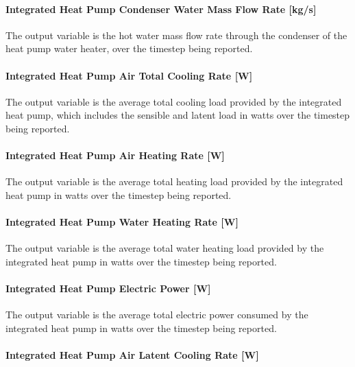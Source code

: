\paragraph{Integrated Heat Pump Condenser Water Mass Flow Rate {[}kg/s{]}}\label{Out-Cond-water-Flow-ASIHP}

The output variable is the hot water mass flow rate through the condenser of the heat pump water heater, over the timestep being reported.

\paragraph{Integrated Heat Pump Air Total Cooling Rate {[}W{]}}\label{Out-Cooling-Coil-Total-Cooling-Rate-ASIHP}

The output variable is the average total cooling load provided by the integrated heat pump, which includes the sensible and latent load in watts over the timestep being reported.


\paragraph{Integrated Heat Pump Air Heating Rate {[}W{]}}\label{Out-Heating-Total-Air-Heating-Rate-ASIHP}

The output variable is the average total heating load provided by the integrated heat pump in watts over the timestep being reported.


\paragraph{Integrated Heat Pump Water Heating Rate {[}W{]}}\label{Out-Total-Water-Heating-Rate-ASIHP}

The output variable is the average total water heating load provided by the integrated heat pump in watts over the timestep being reported.

\paragraph{Integrated Heat Pump Electric Power {[}W{]}}\label{Out-Total-Electric-Power-ASIHP}

The output variable is the average total electric power consumed by the integrated heat pump in watts over the timestep being reported.


\paragraph{Integrated Heat Pump Air Latent Cooling Rate {[}W{]}}\label{Out-Total-Latent-Cooling-Rate-ASIHP}

